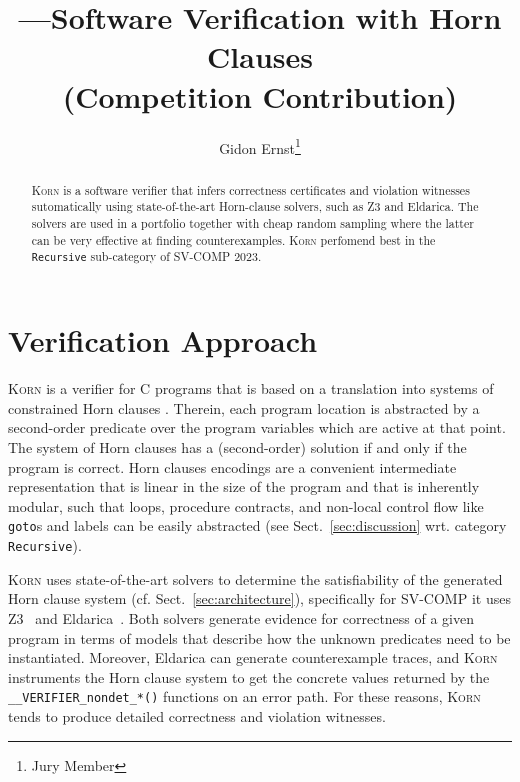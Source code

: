 \documentclass{llncs}
\author{Gidon Ernst\thanks{Jury Member} \quad \mailto{gidon.ernst@lmu.de}}
\title{\Korn---Software Verification with Horn Clauses \\ (Competition Contribution)}
\institute{LMU Munich, Munich, Germany}
\newcommand{\Korn}{\textsc{Korn}\xspace}
\begin{document}
\maketitle

\begin{abstract}
    \Korn is a software verifier that infers correctness certificates
    and violation witnesses
    sutomatically using state-of-the-art Horn-clause solvers, such as Z3 and Eldarica.
    The solvers are used in a portfolio together with cheap random sampling
    where the latter can be very effective at finding counterexamples.
    \Korn perfomend best in the \texttt{Recursive} sub-category of SV-COMP 2023.

\end{abstract}

\section{Verification Approach}
\label{sec:approach}

\Korn is a verifier for C programs that is based on a translation into systems of constrained Horn clauses
\cite{bjorner2015horn,gurfinkel2019science}.
Therein, each program location is abstracted by a second-order predicate
over the program variables which are active at that point.
The system of Horn clauses has a (second-order) solution if and only if the program is correct.
Horn clauses encodings are a convenient intermediate representation
that is linear in the size of the program
and that is inherently modular,
such that loops, procedure contracts, and non-local control flow like \texttt{goto}s and labels can be easily abstracted (see Sect.~\ref{sec:discussion} wrt. category \texttt{Recursive}).

\Korn uses state-of-the-art solvers to determine the satisfiability of the generated Horn clause system (cf. Sect.~\ref{sec:architecture}),
specifically for SV-COMP it uses Z3~\cite{bjorner2013solving} and Eldarica~\cite{hojjat2018eldarica}.
Both solvers generate evidence for correctness of a given program in terms of models that describe how the unknown predicates need to be instantiated.
Moreover, Eldarica can generate counterexample traces, and \Korn instruments the Horn clause system to get
the concrete values returned by the \texttt{\_\_VERIFIER\_nondet\_*()} functions on an error path.
For these reasons, \Korn tends to produce detailed correctness and violation witnesses.
\end{document}
